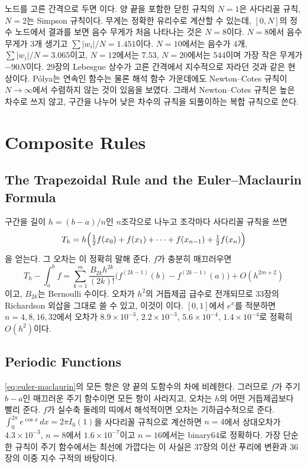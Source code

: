 노드를 고른 간격으로 두면 이다. 양 끝을 포함한 닫힌 규칙의 $N=1$은 사다리꼴 규칙, $N=2$는 Simpson 규칙이다. 무게는 정확한 유리수로 계산할 수 있는데, $[0,N]$의 정수 노드에서 결과를 보면 음수 무게가 처음 나타나는 것은 $N=8$이다. $N=8$에서 음수 무게가 $3$개 생기고 $\sum|w_i|/N=1.451$이다. $N=10$에서는 음수가 $4$개, $\sum|w_i|/N=3.065$이고, $N=12$에서는 $7.53$, $N=20$에서는 $544$이며 가장 작은 무게가 $-90N$이다. 29장의 Lebesgue 상수가 고른 간격에서 지수적으로 자라던 것과 같은 현상이다. Pólya는 연속인 함수는 물론 해석 함수 가운데에도 Newton--Cotes 규칙이 $N\to\infty$에서 수렴하지 않는 것이 있음을 보였다\cite{polya1933}. 그래서 Newton--Cotes 규칙은 높은 차수로 쓰지 않고, 구간을 나누어 낮은 차수의 규칙을 되풀이하는 복합 규칙으로 쓴다.

\section{Composite Rules}
\label{sec:composite}

\subsection{The Trapezoidal Rule and the Euler--Maclaurin Formula}

구간을 길이 $h=(b-a)/n$인 $n$조각으로 나누고 조각마다 사다리꼴 규칙을 쓰면 
\[
T_h=h\Bigl(\tfrac12f(x_0)+f(x_1)+\dots+f(x_{n-1})+\tfrac12f(x_n)\Bigr)
\]
을 얻는다. 그 오차는 이 정확히 말해 준다. $f$가 충분히 매끄러우면
\begin{equation}
\label{eq:euler-maclaurin}
T_h-\int_a^bf=\sum_{k=1}^{m}\frac{B_{2k}h^{2k}}{(2k)!}\bigl(f^{(2k-1)}(b)-f^{(2k-1)}(a)\bigr)+O(h^{2m+2})
\end{equation}
이고, $B_{2k}$는 Bernoulli 수이다\cite{atkinson1989}. 오차가 $h^2$의 거듭제곱 급수로 전개되므로 33장의 Richardson 외삽을 그대로 쓸 수 있고, 이것이 이다. $[0,1]$에서 $e^x$를 적분하면 $n=4,8,16,32$에서 오차가 $8.9\times10^{-3}$, $2.2\times10^{-3}$, $5.6\times10^{-4}$, $1.4\times10^{-4}$로 정확히 $O(h^2)$이다.

\subsection{Periodic Functions}

\eqref{eq:euler-maclaurin}의 모든 항은 양 끝의 도함수의 차에 비례한다. 그러므로 $f$가 주기 $b-a$인 매끄러운 주기 함수이면 모든 항이 사라지고, 오차는 $h$의 어떤 거듭제곱보다 빨리 준다. $f$가 실수축 둘레의 띠에서 해석적이면 오차는 기하급수적으로 준다\cite{trefethen2014trapezoidal}. $\int_0^{2\pi}e^{\cos x}\,dx=2\pi I_0(1)$을 사다리꼴 규칙으로 계산하면 $n=4$에서 상대오차가 $4.3\times10^{-3}$, $n=8$에서 $1.6\times10^{-7}$이고 $n=16$에서는 binary64로 정확하다. 가장 단순한 규칙이 주기 함수에서는 최선에 가깝다는 이 사실은 37장의 이산 푸리에 변환과 36장의 이중 지수 구적의 바탕이다.

